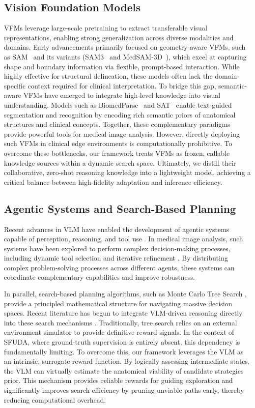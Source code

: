 \documentclass[sigconf, screen]{acmart}
\begin{document}
\subsection{Vision Foundation Models}
VFMs leverage large-scale pretraining to extract transferable visual representations, enabling strong generalization across diverse modalities and domains. Early advancements primarily focused on geometry-aware VFMs, such as SAM~\cite{sam} and its variants (SAM3~\cite{sam3} and MedSAM-3D~\cite{medsam3d}), which excel at capturing shape and boundary information via flexible, prompt-based interaction. While highly effective for structural delineation, these models often lack the domain-specific context required for clinical interpretation. To bridge this gap, semantic-aware VFMs have emerged to integrate high-level knowledge into visual understanding. Models such as BiomedParse~\cite{biomedparse} and SAT~\cite{sat} enable text-guided segmentation and recognition by encoding rich semantic priors of anatomical structures and clinical concepts. Together, these complementary paradigms provide powerful tools for medical image analysis. However, directly deploying such VFMs in clinical edge environments is computationally prohibitive. To overcome these bottlenecks, our framework treats VFMs as frozen, callable knowledge sources within a dynamic search space. Ultimately, we distill their collaborative, zero-shot reasoning knowledge into a lightweight model, achieving a critical balance between high-fidelity adaptation and inference efficiency.

\subsection{Agentic Systems and Search-Based Planning}
Recent advances in VLM have enabled the development of agentic systems capable of perception, reasoning, and tool use \cite{ipo}. In medical image analysis, such systems have been explored to perform complex decision-making processes, including dynamic tool selection and iterative refinement \cite{Li2024AgentHA,zhu2025intelligentagenticcompleximage,coevolvingagent}. By distributing complex problem-solving processes across different agents, these systems can coordinate complementary capabilities and improve robustness.

In parallel, search-based planning algorithms, such as Monte Carlo Tree Search \cite{MCTS_survey}, provide a principled mathematical structure for navigating massive decision spaces. Recent literature has begun to integrate VLM-driven reasoning directly into these search mechanisms \cite{CollaborativeTreeSearch}. Traditionally, tree search relies on an external environment simulator to provide definitive reward signals. In the context of SFUDA, where ground-truth supervision is entirely absent, this dependency is fundamentally limiting. To overcome this, our framework leverages the VLM as an intrinsic, surrogate reward function. By logically assessing intermediate states, the VLM can virtually estimate the anatomical viability of candidate strategies prior. This mechanism provides reliable rewards for guiding exploration and significantly improves search efficiency by pruning unviable paths early, thereby reducing computational overhead.
\end{document}
